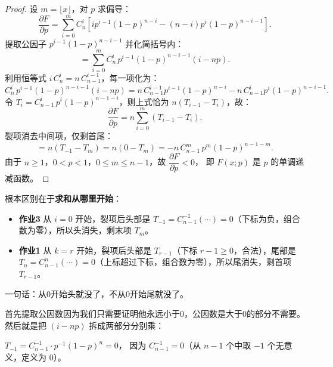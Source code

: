 \begin{proof}
设 $m = \lfloor x \rfloor$，对 $p$ 求偏导：
\[
\frac{\partial F}{\partial p} = \sum_{i=0}^{m} C_n^i \left[ ip^{i-1}(1-p)^{n-i} - (n-i)p^i(1-p)^{n-i-1} \right].
\]
提取公因子 $p^{i-1}(1-p)^{n-i-1}$ 并化简括号内：
\[
= \sum_{i=0}^{m} C_n^i\, p^{i-1}(1-p)^{n-i-1}(i - np).
\]
利用恒等式 $i\, C_n^i = n\, C_{n-1}^{i-1}$，每一项化为：
\[
C_n^i\, p^{i-1}(1-p)^{n-i-1}(i-np)
= n\, C_{n-1}^{i-1} p^{i-1}(1-p)^{n-i} - n\, C_{n-1}^{i} p^{i}(1-p)^{n-i-1}.
\]
令 $T_i = C_{n-1}^{i}\, p^i(1-p)^{n-1-i}$，则上式恰为 $n(T_{i-1} - T_i)$，故：
\[
\frac{\partial F}{\partial p} = n\sum_{i=0}^{m}(T_{i-1} - T_i).
\]
裂项消去中间项，仅剩首尾：
\[
= n(T_{-1} - T_m) = n(0 - T_m) = -n\, C_{n-1}^{m}\, p^m(1-p)^{n-1-m}.
\]
由于 $n \geq 1$，$0 < p < 1$，$0 \leq m \leq n-1$，故 $\dfrac{\partial F}{\partial p} < 0$，
即 $F(x;p)$ 是 $p$ 的单调递减函数。
\end{proof}
\begin{dxtips}
    根本区别在于\textbf{求和从哪里开始}：
\begin{itemize}
    \item \textbf{作业3} 从 $i=0$ 开始，裂项后头部是 $T_{-1} = C_{n-1}^{-1}(\cdots) = 0$（下标为负，组合数为零），所以头消失，剩末项 $T_m$。
    \item \textbf{作业1} 从 $k=r$ 开始，裂项后头部是 $T_{r-1}$（下标 $r-1 \geq 0$，合法），尾部是 $T_n = C_{n-1}^{n}(\cdots) = 0$（上标超过下标，组合数为零），所以尾消失，剩首项 $T_{r-1}$。
\end{itemize}
一句话：从0开始头就没了，不从0开始尾就没了。
\end{dxtips}
\begin{dxtips}
    首先提取公因数因为我们只需要证明他永远小于0，公因数是大于0的部分不需要。然后就是把 $(i-np)$ 拆成两部分分别乘：

\end{dxtips}
\begin{note}
    $T_{-1} = C_{n-1}^{-1} \cdot p^{-1}(1-p)^n = 0$，
因为 $C_{n-1}^{-1} = 0$（从 $n-1$ 个中取 $-1$ 个无意义，定义为 $0$）。
\end{note}
